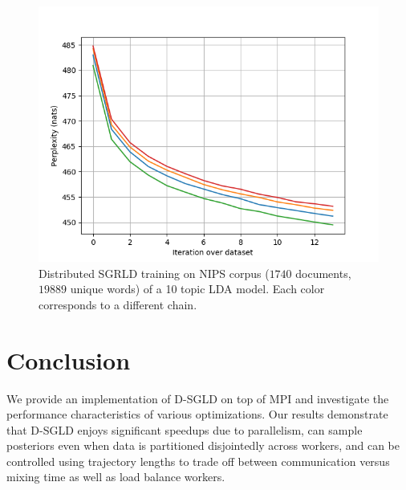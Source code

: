 \documentclass{article}
\begin{document}
\begin{figure}[htbp]
  \centering
  \includegraphics[width=0.5\linewidth]{poster-figures/perplexity-lda.png}
  \caption{Distributed SGRLD training on NIPS corpus ($1740$ documents,
    $19889$ unique words) of a 10 topic LDA model. Each color corresponds to a different chain.}
  \label{fig:perplexity-sgrld}
\end{figure}

\section{Conclusion}

We provide an implementation of D-SGLD on top of MPI and investigate the performance
characteristics of various optimizations. Our results demonstrate that D-SGLD enjoys
significant speedups due to parallelism, can sample posteriors even when data is partitioned
disjointedly across workers, and can be controlled using trajectory lengths to trade off
between communication versus mixing time as well as load balance workers.



\end{document}
